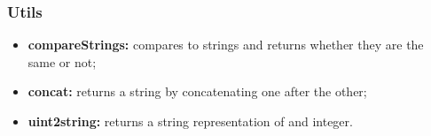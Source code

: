 \subsubsection{Utils}
\begin{itemize}
	\item \textbf{compareStrings:} compares to strings and returns whether they are the same or not;
	\item \textbf{concat:} returns a string by concatenating one after the other;
	\item \textbf{uint2string:} returns a string representation of and integer.
\end{itemize}
